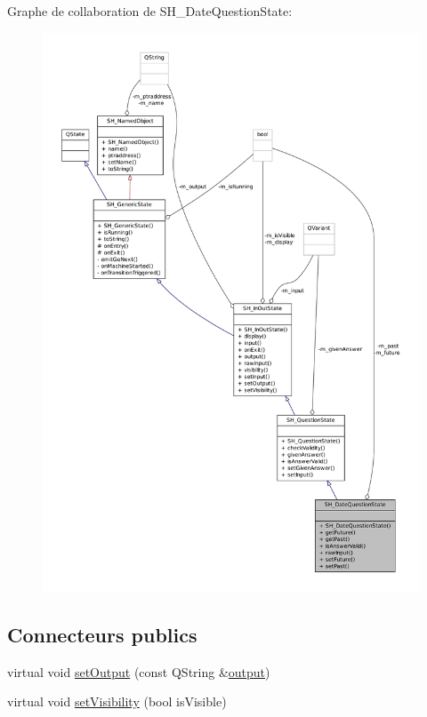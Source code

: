 Graphe de collaboration de S\-H\-\_\-\-Date\-Question\-State\-:
\nopagebreak
\begin{figure}[H]
\begin{center}
\leavevmode
\includegraphics[width=350pt]{classSH__DateQuestionState__coll__graph}
\end{center}
\end{figure}
\subsection*{Connecteurs publics}
\begin{DoxyCompactItemize}
\item 
virtual void \hyperlink{classSH__InOutState_af611c84134e262739cd834797b315c80}{set\-Output} (const Q\-String \&\hyperlink{classSH__InOutState_a17ed7eaf5e3ed5af80a4f9fe65d5bfd9}{output})
\item 
virtual void \hyperlink{classSH__InOutState_a7fdfaa6f600f0ac4a96f238a038ba9ad}{set\-Visibility} (bool is\-Visible)
\end{DoxyCompactItemize}

